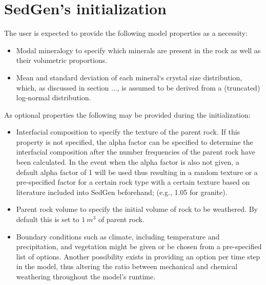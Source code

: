 \section{SedGen's initialization}
The user is expected to provide the following model properties as a necessity:
\begin{itemize}
    \item Modal mineralogy to specify which minerals are present in the rock as well as their volumetric proportions. %
    \item Mean and standard deviation of each mineral`s crystal size distribution, which, as discussed in section ..., is assumed to be derived from a (truncated) log-normal distribution. %
\end{itemize}

As optional properties the following may be provided during the initialization:
\begin{itemize}
    \item Interfacial composition to specify the texture of the parent rock. %
    If this property is not specified, the alpha factor can be specified to determine the interfacial composition after the number frequencies of the parent rock have been calculated. %
    In the event when the alpha factor is also not given, a default alpha factor of 1 will be used thus resulting in a random texture or a pre-specified factor for a certain rock type with a certain texture based on literature included into SedGen beforehand; (e.g., 1.05 for granite). %
    \item Parent rock volume to specify the initial volume of rock to be weathered.
    By default this is set to \(1\ m^{3}\) of parent rock.
    \item Boundary conditions such as climate, including temperature and precipitation, and vegetation might be given or be chosen from a pre-specified list of options. %
    Another possibility exists in providing an option per time step in the model, thus altering the ratio between mechanical and chemical weathering throughout the model's runtime. %
\end{itemize}


